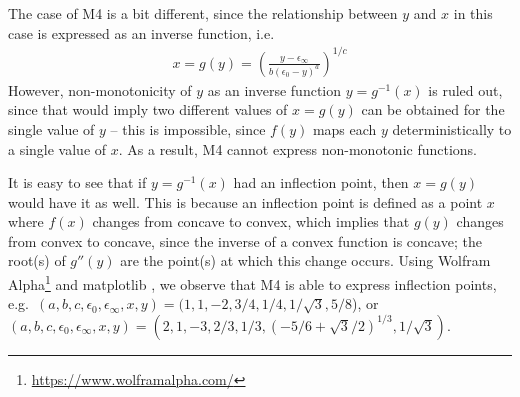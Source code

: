 \documentclass{article} %
\begin{document}
The case of M4 is a bit different, since the relationship between $y$ and $x$ in this case is expressed as an inverse function, i.e.
\begin{align}
\label{eqn:M4}
x = g(y) = \left(\frac{y - \epsilon_{\infty}} {b(\epsilon_{0} - y)^a}\right)^{1/c}
\end{align}
However, non-monotonicity of $y$ as an inverse function $y = g^{-1}(x)$ is ruled out, since that would imply two different values of $x=g(y)$ can be obtained for the single value of $y$ -- this is impossible, since $f(y)$ maps each $y$ deterministically to a single value of $x$. As a result, M4 cannot express non-monotonic functions.

It is easy to see that if $y=g^{-1}(x)$ had an inflection point, then $x = g(y)$ would have it as well. This is because an inflection point is defined as a point $x$ where $f(x)$ changes from concave to convex, which implies that $g(y)$ changes from convex to concave, since the inverse of a convex function is concave; the root(s) of $g''(y)$ are the point(s) at which this change occurs.
Using Wolfram Alpha\footnote{\href{https://www.wolframalpha.com/}{https://www.wolframalpha.com/}} and matplotlib \citep{Hunter:2007}, we observe that M4 is able to express inflection points, e.g.\ $(a,b,c,\epsilon_0, \epsilon_{\infty}, x, y) = (1,1,-2,3/4,1/4,1/\sqrt3, 5/8$), or $(a,b,c,\epsilon_0, \epsilon_{\infty}, x, y) = (2,1,-3,2/3,1/3,(-5/6 + \sqrt3/2)^{1/3}, 1/\sqrt3)$. %






\end{document}
